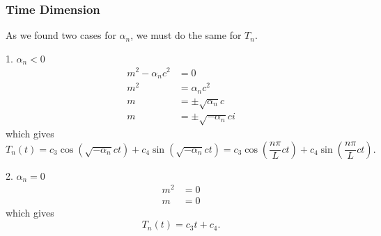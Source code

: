 \documentclass{article}
\begin{document}
\subsubsection{Time Dimension}
As we found two cases for \(\alpha_n\), we must do the same for
\(T_n\).
\begin{proofcase}{1. \(\alpha_n < 0\)}\let\qed\relax
    \begin{align*}
        m^2 - \alpha_n c^2 & = 0                        \\
        m^2                & = \alpha_n c^2             \\
        m                  & = \pm \sqrt{\alpha_n} c    \\
        m                  & = \pm \sqrt{-\alpha_n} c i
    \end{align*}
    which gives
    \begin{equation*}
        T_n\left( t \right) = c_3 \cos{\left( \sqrt{-\alpha_n} c t \right)} + c_4 \sin{\left( \sqrt{-\alpha_n} c t \right)} = c_3 \cos{\left( \frac{n \pi}{L} c t \right)} + c_4 \sin{\left( \frac{n \pi}{L} c t \right)}.
    \end{equation*}
\end{proofcase}
\begin{proofcase}{2. \(\alpha_n = 0\)}\let\qed\relax
    \begin{align*}
        m^2 & = 0 \\
        m   & = 0
    \end{align*}
    which gives
    \begin{equation*}
        T_n\left( t \right) = c_3 t + c_4.
    \end{equation*}
\end{proofcase}
\end{document}

